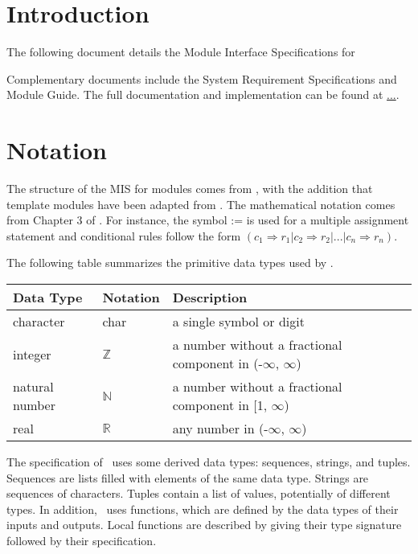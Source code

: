\documentclass[12pt, titlepage]{article}
\begin{document}
\section{Introduction}

The following document details the Module Interface Specifications for

Complementary documents include the System Requirement Specifications
and Module Guide.  The full documentation and implementation can be
found at \url{...}.  

\section{Notation}


The structure of the MIS for modules comes from \citet{HoffmanAndStrooper1995},
with the addition that template modules have been adapted from
\cite{GhezziEtAl2003}.  The mathematical notation comes from Chapter 3 of
\citet{HoffmanAndStrooper1995}.  For instance, the symbol := is used for a
multiple assignment statement and conditional rules follow the form $(c_1
\Rightarrow r_1 | c_2 \Rightarrow r_2 | ... | c_n \Rightarrow r_n )$.

The following table summarizes the primitive data types used by \progname. 

\begin{center}
\renewcommand{\arraystretch}{1.2}
\noindent 
\begin{tabular}{l l p{7.5cm}} 
\toprule 
\textbf{Data Type} & \textbf{Notation} & \textbf{Description}\\ 
\midrule
character & char & a single symbol or digit\\
integer & $\mathbb{Z}$ & a number without a fractional component in (-$\infty$, $\infty$) \\
natural number & $\mathbb{N}$ & a number without a fractional component in [1, $\infty$) \\
real & $\mathbb{R}$ & any number in (-$\infty$, $\infty$)\\
\bottomrule
\end{tabular} 
\end{center}

\noindent
The specification of \progname \ uses some derived data types: sequences, strings, and
tuples. Sequences are lists filled with elements of the same data type. Strings
are sequences of characters. Tuples contain a list of values, potentially of
different types. In addition, \progname \ uses functions, which
are defined by the data types of their inputs and outputs. Local functions are
described by giving their type signature followed by their specification.
\end{document}
